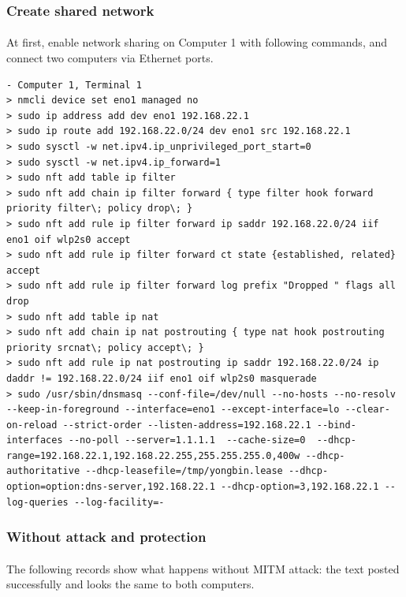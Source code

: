 \documentclass[mscthesis]{usiinfthesis}
\begin{document}
\subsubsection{Create shared network}
\paragraph{}
At first, enable network sharing on Computer 1 with following commands, and connect two computers via Ethernet ports.
\begin{lstlisting}[language={},frame=single,breaklines=true,postbreak=\mbox{\textcolor{red}{$\hookrightarrow$}\space}]
- Computer 1, Terminal 1
> nmcli device set eno1 managed no
> sudo ip address add dev eno1 192.168.22.1
> sudo ip route add 192.168.22.0/24 dev eno1 src 192.168.22.1
> sudo sysctl -w net.ipv4.ip_unprivileged_port_start=0
> sudo sysctl -w net.ipv4.ip_forward=1
> sudo nft add table ip filter
> sudo nft add chain ip filter forward { type filter hook forward priority filter\; policy drop\; }
> sudo nft add rule ip filter forward ip saddr 192.168.22.0/24 iif eno1 oif wlp2s0 accept
> sudo nft add rule ip filter forward ct state {established, related} accept
> sudo nft add rule ip filter forward log prefix "Dropped " flags all drop
> sudo nft add table ip nat
> sudo nft add chain ip nat postrouting { type nat hook postrouting priority srcnat\; policy accept\; }
> sudo nft add rule ip nat postrouting ip saddr 192.168.22.0/24 ip daddr != 192.168.22.0/24 iif eno1 oif wlp2s0 masquerade
> sudo /usr/sbin/dnsmasq --conf-file=/dev/null --no-hosts --no-resolv --keep-in-foreground --interface=eno1 --except-interface=lo --clear-on-reload --strict-order --listen-address=192.168.22.1 --bind-interfaces --no-poll --server=1.1.1.1  --cache-size=0  --dhcp-range=192.168.22.1,192.168.22.255,255.255.255.0,400w --dhcp-authoritative --dhcp-leasefile=/tmp/yongbin.lease --dhcp-option=option:dns-server,192.168.22.1 --dhcp-option=3,192.168.22.1 --log-queries --log-facility=-
\end{lstlisting}

\subsubsection{Without attack and protection}
\paragraph{}
The following records show what happens without MITM attack: the text posted successfully and looks the same to both computers.
\end{document}

